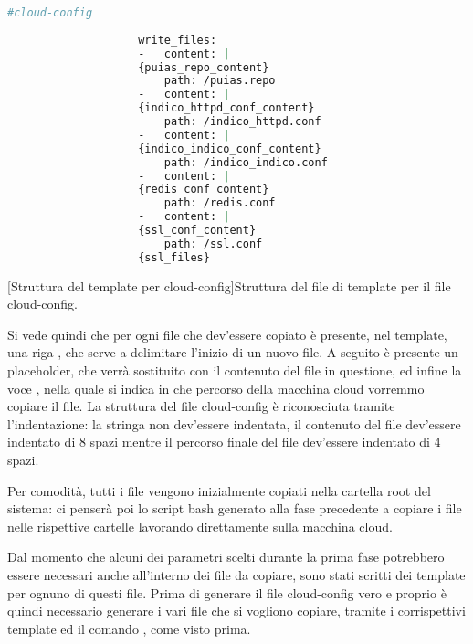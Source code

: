             \begin{center}
                \begin{lstlisting}[language=bash, gobble=18]
                    #cloud-config
                    
                    write_files:
                    -   content: |
                    {puias_repo_content}
                        path: /puias.repo
                    -   content: |
                    {indico_httpd_conf_content}
                        path: /indico_httpd.conf
                    -   content: |
                    {indico_indico_conf_content}
                        path: /indico_indico.conf
                    -   content: |
                    {redis_conf_content}
                        path: /redis.conf
                    -   content: |
                    {ssl_conf_content}
                        path: /ssl.conf
                    {ssl_files}
                \end{lstlisting}
                \captionsetup{textformat=empty,labelformat=empty} \vspace{-2em}
                [Struttura del template per cloud-config]{Struttura del file di template per il file cloud-config.}
            \end{center}
            
            Si vede quindi che per ogni file che dev'essere copiato è presente, nel template, una riga , che serve a delimitare l'inizio di un nuovo file. A seguito è presente un placeholder, che verrà sostituito con il contenuto del file in questione, ed infine la voce , nella quale si indica in che percorso della macchina cloud vorremmo copiare il file. La struttura del file cloud-config è riconosciuta tramite l'indentazione: la stringa  non dev'essere indentata, il contenuto del file dev'essere indentato di 8 spazi mentre il percorso finale del file dev'essere indentato di 4 spazi.
            
            Per comodità, tutti i file vengono inizialmente copiati nella cartella root \bash{/} del sistema: ci penserà poi lo script bash generato alla fase precedente a copiare i file nelle rispettive cartelle lavorando direttamente sulla macchina cloud.
            
            Dal momento che alcuni dei parametri scelti durante la prima fase potrebbero essere necessari anche all'interno dei file da copiare, sono stati scritti dei template per ognuno di questi file. Prima di generare il file cloud-config vero e proprio è quindi necessario generare i vari file che si vogliono copiare, tramite i corrispettivi template ed il comando , come visto prima.
            
